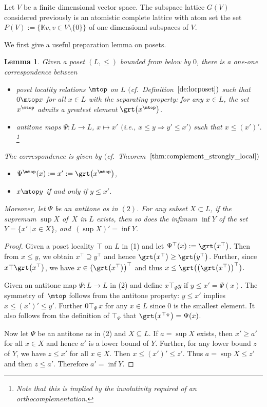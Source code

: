 \documentclass[pdftex]{sigma}
\numberwithin{equation}{section}
\newtheorem{Lemma}[Theorem]{Lemma}
\newcommand{\K}{\mathbb{K}}
\begin{document}
\begin{Example}Let $V$ be a finite dimensional vector space.
	The subspace lattice $G(V)$ con\-si\-de\-red previously is an atomistic complete lattice with atom set the set $P(V):=\{\K v, v\in V\setminus\{0\}\}$ of one dimensional subspaces of $V$.
\end{Example}
We first give a useful preparation lemma on posets.
\begin{Lemma}\label{lemmaA6}
	Given a poset $(L, \leq)$ bounded from below by $0$, there is a one-one correspondence between
	\begin{itemize}\itemsep=0pt
		\item[$(1)$] {\it poset locality} relations $\mtop$ on $L$
$($cf.\ Definition~$\ref{de:locposet})$ such that $0\mtop x$ for all $x\in L $ with the {\it separating property}: for any $x\in L$, the set $x^\mtop$ admits a greatest element $\grt \big(x^\mtop\big)$.
		\item[$(2)$] {\it antitone} maps $\Psi\colon L\to L$, $x\mapsto x'$ $($i.e., $x\leq y\Rightarrow y'\leq x'$$)$ such that $x\leq (x')'.$\footnote{Note that this is implied by the involutivity required of an orthocomplementation.}
	\end{itemize}
	The correspondence is given by $($cf.\ Theorem~$\ref{thm:complement_strongly_local})$
	\begin{itemize}\itemsep=0pt
		\item $\Psi^\mtop(x):=x':=\grt \big(x^\mtop\big)$,
		\item $x\mtop y$ if and only if $y\leq x'$.
	\end{itemize}
	
	Moreover, let $\Psi$ be an antitone as in $(2)$. For any subset $X\subset L$, if the supremum $\sup X$ of~$X$ in $L$ exists, then so does the infimum $\inf Y$ of the set
	$Y=\{x'\,|\, x\in X\}$, and~$(\sup X)'=\inf Y$.
\end{Lemma}
\begin{proof}
Given a poset locality $\top$ on $L$ in (1) and let $\Psi^\top (x):=\grt \big(x^\top\big)$. Then from $x\leq y$, we obtain $x^\top \supseteq y^\top$ and hence $\grt\big(x^\top\big) \geq \grt\big(y^\top\big)$.
Further, since $x\top \grt \big(x^\top\big)$, we have $x\in \big(\grt\big(x^\top\big)\big)^\top$ and thus
$x\leq \grt\big(\big(\grt\big(x^\top\big)\big)^\top\big).$

Given an antitone map $\Psi\colon L\to L$ in (2) and define $x\top_\Psi y$ if $y\leq x'=\Psi(x)$. The symmetry of~$\mtop$ follows from the antitone property: $y\leq x'$ implies $x\leq (x')'\leq y'$. Further $0\top_\Psi\, x$ for any $x\in L$ since $0$ is the smallest element. It also follows from the definition of $\top_\Psi$ that $\grt \big(x^{\top_\Psi}\big)=\Psi(x)$.

Now let $\Psi$ be an antitone as in (2) and $X\subseteq L$.
If $a=\sup X$ exists, then $x'\geq a'$ for all $x\in X$ and hence $a'$ is a lower bound of $Y$. Further, for any lower bound $z$ of $Y$, we have $z\leq x'$ for all $x\in X$. Then $x\leq (x')'\leq z'$. Thus $a=\sup X\leq z'$ and then $z\leq a'$. Therefore $a'=\inf Y$.
\end{proof}
\end{document}
